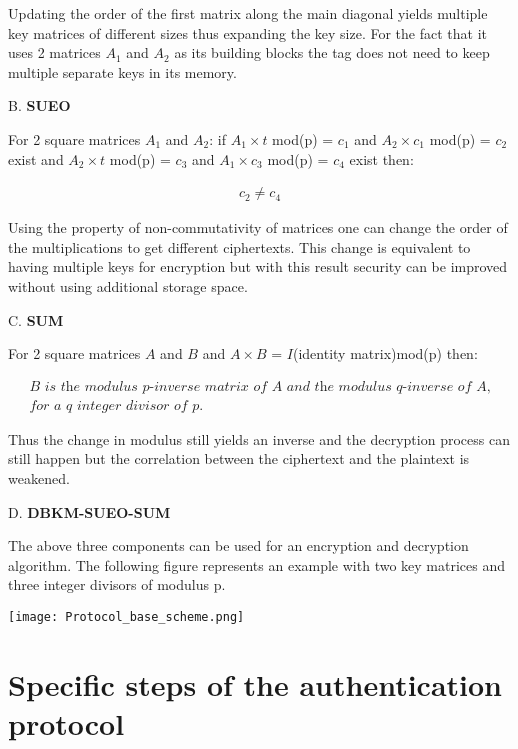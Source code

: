     Updating the order of the first matrix along the main diagonal yields multiple key matrices of different sizes thus expanding the key size. For the fact that 
    it uses 2 matrices $A_1$ and $A_2$ as its building blocks the tag does not need to keep multiple separate keys in its memory.

    B. \textbf{SUEO}

    For 2 square matrices $A_1$ and $A_2$: if $A_1 \times t$ mod(p) = $c_1$ and $A_2 \times c_1$ mod(p) = $c_2$ exist and $A_2 \times t$ mod(p) = $c_3$ and 
    $A_1 \times c_3$ mod(p) = $c_4$ exist then: 
    
    \begin{gather*}
        c_2 \neq c_4
    \end{gather*}

    Using the property of non-commutativity of matrices one can change the order of the multiplications to get different ciphertexts. This change is equivalent to having multiple keys for
    encryption but with this result security can be improved without using additional storage space.

    C. \textbf{SUM}

    For 2 square matrices $A$ and $B$ and $A \times B$ = $I$(identity matrix)mod(p) then: 
    
    \begin{gather*}
        \textit{B is the modulus p-inverse matrix of A and the modulus q-inverse of A,}\\
        \textit{for a q integer divisor of p.}
    \end{gather*}

    Thus the change in modulus still yields an inverse and the decryption process can still happen but the correlation between the ciphertext and the plaintext is weakened.

    D. \textbf{DBKM-SUEO-SUM}

    The above three components can be used for an encryption and decryption algorithm. The following figure represents an example with two key matrices and three
    integer divisors of modulus p.

    \begin{center}
    \texttt{[image: Protocol\_base\_scheme.png]}
    \end{center}

\section{Specific steps of the authentication protocol}

